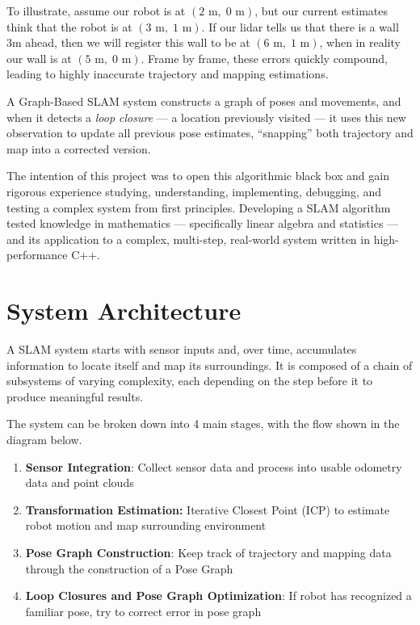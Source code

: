 \documentclass[12pt]{report}
\begin{document}
To illustrate, assume our robot is at $(2\text{ m},\; 0\text{ m})$, but our current estimates think that the 
robot is at $(3\text{ m},\; 1\text{ m})$.
If our lidar tells us that there is a wall 3m ahead, then we will register this wall to be at $(6\text{ m},\; 1\text{ m})$, 
when in reality our wall is at $(5\text{ m},\; 0\text{ m})$.\newline
Frame by frame, these errors quickly compound, leading to highly inaccurate trajectory and mapping estimations.

A Graph-Based SLAM system constructs a graph of poses and movements, and when it detects a
\textit{loop closure} --- a location previously visited --- it uses this new observation to update all
previous pose estimates, ``snapping'' both trajectory and map into a corrected version.

The intention of this project was to open this algorithmic black box and gain rigorous experience
studying, understanding, implementing, debugging, and testing a complex system from first principles.
Developing a SLAM algorithm tested knowledge in mathematics --- specifically linear algebra and
statistics --- and its application to a complex, multi-step, real-world system written in
high-performance C++.

\chapter{System Architecture}

A SLAM system starts with sensor inputs and, over time, accumulates information to locate itself and
map its surroundings.
It is composed of a chain of subsystems of varying complexity, each depending on the step before it
to produce meaningful results.

The system can be broken down into 4 main stages, with the flow shown in the diagram below. 
\begin{enumerate}
    \item \textbf{Sensor Integration}: Collect sensor data and process into usable odometry data and point clouds
    \item \textbf{Transformation Estimation:} Iterative Closest Point (ICP) to estimate robot motion
and map surrounding environment
    \item \textbf{Pose Graph Construction}: Keep track of trajectory and mapping data through the construction of a Pose Graph
    \item \textbf{Loop Closures and Pose Graph Optimization}: If robot has recognized a familiar pose, try to correct error in pose graph
\end{enumerate}
\end{document}
